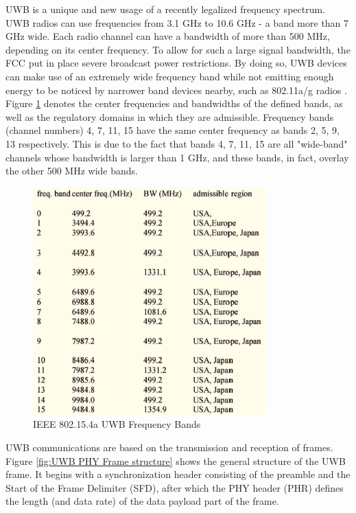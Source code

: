 UWB is a unique and new usage of a recently legalized frequency spectrum. UWB radios can use frequencies from 3.1 GHz to 10.6 GHz - a band more than 7 GHz wide. Each radio channel can have a bandwidth of more than 500 MHz, depending on its center frequency. To allow for such a large signal bandwidth, the FCC put in place severe broadcast power restrictions. By doing so, UWB devices can make use of an extremely wide frequency band while not emitting enough energy to be noticed by narrower band devices nearby, such as 802.11a/g radios \cite{karapistoli2010overview}. Figure \ref{fig:IEEE 802.15.4a UWB Frequency Bands} denotes the center frequencies and bandwidths of the defined bands, as well as the regulatory domains in which they are admissible. Frequency bands (channel numbers) 4, 7, 11, 15 have the same center frequency as bands 2, 5, 9, 13 respectively. This is due to the fact that bands 4, 7, 11, 15 are all "wide-band" channels whose bandwidth is larger than 1 GHz, and these bands, in fact, overlay the other 500 MHz wide bands.

\begin{figure}[h!]
    \includegraphics[width=0.8\textwidth]{figures/uwbchannels.png}
    \centering
   \caption[IEEE 802.15.4a UWB Frequency Bands]{IEEE 802.15.4a UWB Frequency Bands \protect\cite{zhang2009uwb}}
    \label{fig:IEEE 802.15.4a UWB Frequency Bands}    
\end{figure}

UWB communications are based on the transmission and reception of frames. Figure \ref{fig:UWB PHY Frame structure} shows the general structure of the UWB frame. It begins with a synchronization header consisting of the preamble and the Start of the Frame Delimiter (SFD), after which the PHY header (PHR) defines the length (and data rate) of the data payload part of the frame.

